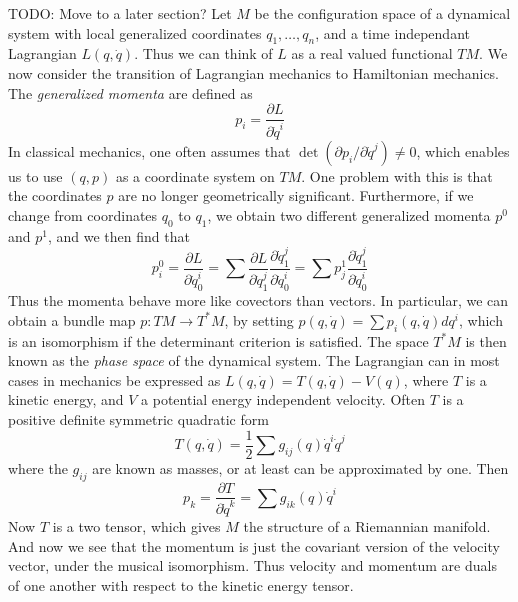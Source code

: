 \begin{example}
    TODO: Move to a later section? Let $M$ be the configuration space of a dynamical system with local generalized coordinates $q_1, \dots, q_n$, and a time independant Lagrangian $L(q,\dot{q})$. Thus we can think of $L$ as a real valued functional $TM$. We now consider the transition of Lagrangian mechanics to Hamiltonian mechanics. The {\it generalized momenta} are defined as
    \[ p_i = \frac{\partial L}{\partial \dot{q}^i} \]
    In classical mechanics, one often assumes that $\det(\partial p_i/\partial \dot{q}^j) \neq 0$, which enables us to use $(q,p)$ as a coordinate system on $TM$. One problem with this is that the coordinates $p$ are no longer geometrically significant. Furthermore, if we change from coordinates $q_0$ to $q_1$, we obtain two different generalized momenta $p^0$ and $p^1$, and we then find that
    \[ p^0_i = \frac{\partial L}{\partial \dot{q}_0^i} = \sum \frac{\partial L}{\partial \dot{q}_1^j} \frac{\partial \dot{q}_1^j}{\partial \dot{q}_0^i} = \sum p^1_j \frac{\partial \dot{q}_1^j}{\partial \dot{q}_0^i} \]
    Thus the momenta behave more like covectors than vectors. In particular, we can obtain a bundle map $p: TM \to T^*M$, by setting $p(q,\dot{q}) = \sum p_i(q,\dot{q}) dq^i$, which is an isomorphism if the determinant criterion is satisfied. The space $T^*M$ is then known as the \emph{phase space} of the dynamical system. The Lagrangian can in most cases in mechanics be expressed as $L(q,\dot{q}) = T(q,\dot{q}) - V(q)$, where $T$ is a kinetic energy, and $V$ a potential energy independent velocity. Often $T$ is a positive definite symmetric quadratic form
    \[ T(q,\dot{q}) = \frac{1}{2} \sum g_{ij}(q) \dot{q}^i \dot{q}^j \]
    where the $g_{ij}$ are known as masses, or at least can be approximated by one. Then
    \[ p_k = \frac{\partial T}{\partial \dot{q}^k} = \sum g_{ik}(q) \dot{q}^i \]
    Now $T$ is a two tensor, which gives $M$ the structure of a Riemannian manifold. And now we see that the momentum is just the covariant version of the velocity vector, under the musical isomorphism. Thus velocity and momentum are duals of one another with respect to the kinetic energy tensor.


\end{example}
